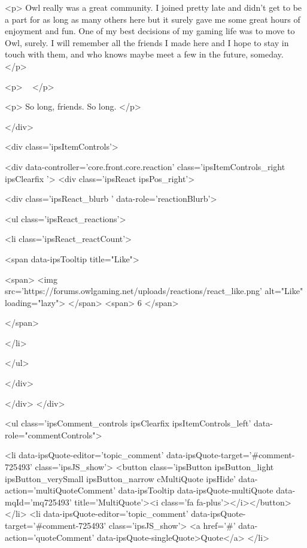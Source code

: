 <p>
	Owl really was a great community. I joined pretty late and didn't get to be a part for as long as many others here but it surely gave me some great hours of enjoyment and fun. One of my best decisions of my gaming life was to move to Owl, surely. I will remember all the friends I made here and I hope to stay in touch with them, and who knows maybe meet a few in the future, someday.
</p>

<p>
	 
</p>

<p>
	So long, friends. So long.
</p>


			
		</div>

		
			<div class='ipsItemControls'>
				
					
						

	<div data-controller='core.front.core.reaction' class='ipsItemControls_right ipsClearfix '>	
		<div class='ipsReact ipsPos_right'>
			
				
				<div class='ipsReact_blurb ' data-role='reactionBlurb'>
					
						

	
	<ul class='ipsReact_reactions'>
		
		
			
				
				<li class='ipsReact_reactCount'>
					
						<span data-ipsTooltip title="Like">
					
							<span>
								<img src='https://forums.owlgaming.net/uploads/reactions/react_like.png' alt="Like" loading="lazy">
							</span>
							<span>
								6
							</span>
					
						</span>
					
				</li>
			
		
	</ul>

					
				</div>
			
			
			
		</div>
	</div>

					
				
				<ul class='ipsComment_controls ipsClearfix ipsItemControls_left' data-role="commentControls">
					
						
							<li data-ipsQuote-editor='topic_comment' data-ipsQuote-target='#comment-725493' class='ipsJS_show'>
								<button class='ipsButton ipsButton_light ipsButton_verySmall ipsButton_narrow cMultiQuote ipsHide' data-action='multiQuoteComment' data-ipsTooltip data-ipsQuote-multiQuote data-mqId='mq725493' title='MultiQuote'><i class='fa fa-plus'></i></button>
							</li>
							<li data-ipsQuote-editor='topic_comment' data-ipsQuote-target='#comment-725493' class='ipsJS_show'>
								<a href='#' data-action='quoteComment' data-ipsQuote-singleQuote>Quote</a>
							</li>
						
